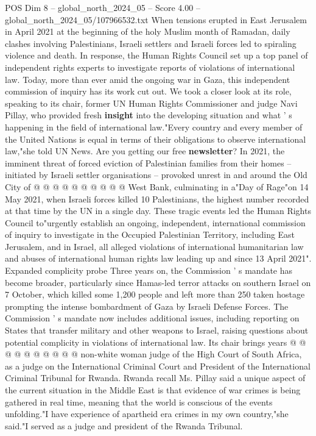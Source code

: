 \begin{textsample}{POS Dim 8 – global\_north\_2024\_05 – Score 4.00 – global\_north\_2024\_05/107966532.txt}  \label{ex:f8_pos_177}
When tensions erupted in East Jerusalem in April 2021 at the beginning of the holy Muslim month of Ramadan, daily clashes involving Palestinians, Israeli settlers and Israeli forces led to spiraling violence and death.
In response, the Human Rights Council set up a top panel of independent rights experts to investigate reports of violations of international law.
Today, more than ever amid the ongoing war in Gaza, this independent commission of inquiry has its work cut out.
We took a closer look at its role, speaking to its chair, former UN Human Rights Commissioner and judge Navi Pillay, who provided fresh \textbf{insight} into the developing situation and what ' s happening in the field of international law."Every country and every member of the United Nations is equal in terms of their obligations to observe international law,"she told UN News.
Are you getting our free \textbf{newsletter}?
In 2021, the imminent threat of forced eviction of Palestinian families from their homes -- initiated by Israeli settler organisations -- provoked unrest in and around the Old City of @ @ @ @ @ @ @ @ @ @ West Bank, culminating in a"Day of Rage"on 14 May 2021, when Israeli forces killed 10 Palestinians, the highest number recorded at that time by the UN in a single day.
These tragic events led the Human Rights Council to"urgently establish an ongoing, independent, international commission of inquiry to investigate in the Occupied Palestinian Territory, including East Jerusalem, and in Israel, all alleged violations of international humanitarian law and abuses of international human rights law leading up and since 13 April 2021".
Expanded complicity probe Three years on, the Commission ' s mandate has become broader, particularly since Hamas-led terror attacks on southern Israel on 7 October, which killed some 1,200 people and left more than 250 taken hostage prompting the intense bombardment of Gaza by Israeli Defense Forces.
The Commission ' s mandate now includes additional issues, including reporting on States that transfer military and other weapons to Israel, raising questions about potential complicity in violations of international law.
Its chair brings years @ @ @ @ @ @ @ @ @ @ non-white woman judge of the High Court of South Africa, as a judge on the International Criminal Court and President of the International Criminal Tribunal for Rwanda.
Rwanda recall Ms.
Pillay said a unique aspect of the current situation in the Middle East is that evidence of war crimes is being gathered in real time, meaning that the world is conscious of the events unfolding."I have experience of apartheid era crimes in my own country,"she said."I served as a judge and president of the Rwanda Tribunal.

\end{textsample}
